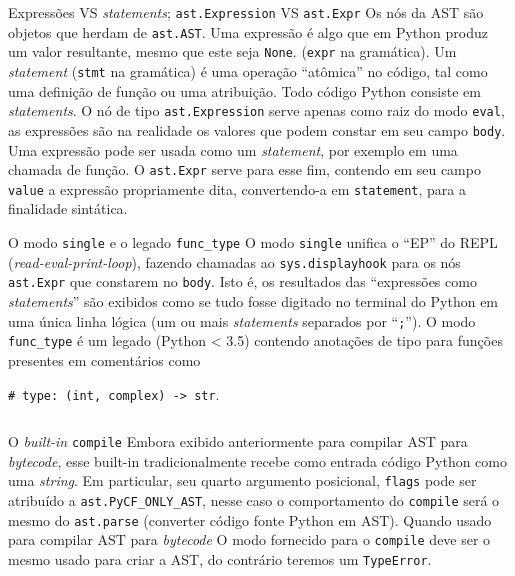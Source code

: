 \documentclass[utf8]{beamer}
\begin{document}
\begin{frame}{Expressões VS \emph{statements};
              \texttt{ast.Expression} VS
              \texttt{ast.Expr}}
  Os nós da AST são objetos que herdam de \texttt{ast.AST}.
  \vfill
  Uma expressão é algo que em Python produz um valor resultante, mesmo
  que este seja \texttt{None}.
  (\texttt{expr} na gramática).
  \vfill
  Um \emph{statement} (\texttt{stmt} na gramática)
  é uma operação ``atômica'' no código,
  tal como uma definição de função ou uma atribuição.
  Todo código Python consiste em \emph{statements}.
  \vfill
  O nó de tipo \texttt{ast.Expression} serve apenas
  como raiz do modo \texttt{eval},
  as expressões são na realidade os valores que podem constar
  em seu campo \texttt{body}.
  \vfill
  Uma expressão pode ser usada como um \emph{statement},
  por exemplo em uma chamada de função.
  O \texttt{ast.Expr} serve para esse fim,
  contendo em seu campo \texttt{value} a expressão propriamente dita,
  convertendo-a em \texttt{statement}, para a finalidade sintática.
\end{frame}


\begin{frame}[fragile]{O modo \texttt{single}
                       e o legado \texttt{func\_type}}
  O modo \texttt{single}
  unifica o ``EP'' do REPL (\emph{read-eval-print-loop}),
  fazendo chamadas ao \texttt{sys.displayhook}
  para os nós \texttt{ast.Expr}
  que constarem no \texttt{body}.
  Isto é, os resultados das ``expressões como \emph{statements}''
  são exibidos como se tudo fosse digitado no terminal do Python
  em uma única linha lógica
  (um ou mais \emph{statements} separados por ``\texttt{;}'').
  \vfill
  O modo \texttt{func\_type} é um legado (Python < 3.5)
  contendo anotações de tipo para funções
  presentes em comentários como

  \texttt{# type: (int, complex) -> str}.
  \vspace{-.8em}%
  \inputminted{console}{func_type_console.txt}
\end{frame}


\begin{frame}[fragile]{O \emph{built-in} \texttt{compile}}
  Embora exibido anteriormente para compilar AST para \emph{bytecode},
  esse built-in tradicionalmente recebe como entrada
  código Python como uma \emph{string}.
  Em particular, seu quarto argumento posicional, \texttt{flags}
  pode ser atribuído a \texttt{ast.PyCF_ONLY_AST},
  nesse caso o comportamento do \texttt{compile}
  será o mesmo do \texttt{ast.parse}
  (converter código fonte Python em AST).
  \vfill
  Quando usado para compilar AST para \emph{bytecode}
  O modo fornecido para o \texttt{compile}
  deve ser o mesmo usado para criar a AST,
  do contrário teremos um \texttt{TypeError}.
\end{frame}
\end{document}
